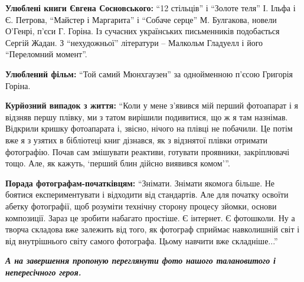 \textbf{Улюблені книги Євгена Сосновського:} \enquote{12 стільців} і \enquote{Золоте теля} І.
Ільфа і Є.  Петрова, \enquote{Майстер і Маргарита} і \enquote{Собаче серце} М. Булгакова,
новели О'Генрі, п'єси Г. Горіна. Із сучасних українських письменників
подобається Сергій Жадан.  З \enquote{нехудожньої} літератури – Малкольм Гладуелл і
його \enquote{Переломний момент}.

\textbf{Улюблений фільм:} \enquote{Той самий Мюнхгаузен} за однойменною п'єсою Григорія
Горіна.

\textbf{Курйозний випадок з життя:} \enquote{Коли у мене з'явився мій перший фотоапарат
і я відзняв першу плівку, ми з татом вирішили подивитися, що ж я там назнімав.
Відкрили кришку фотоапарата і, звісно, нічого на плівці не побачили. Це потім
вже я з узятих в бібліотеці книг дізнався, як з відзнятої плівки отримати
фотографію. Почав сам змішувати реактиви, готувати проявники, закріплювачі
тощо. Але, як кажуть, \enquote{перший блин дійсно виявився комом}}.

\textbf{Порада фотографам-початківцям:} \enquote{Знімати. Знімати якомога більше. Не
боятися експериментувати і відходити від стандартів. Але для початку освоїти
абетку фотографії, щоб розуміти технічну сторону процесу зйомки, основи
композиції.  Зараз це зробити набагато простіше. Є інтернет. Є фотошколи. Ну а
творча складова вже залежить від того, як фотограф сприймає навколишній світ і
від внутрішнього світу самого фотографа. Цьому навчити вже складніше...}

\begin{center}
\color{blue}\em\textbf{А на завершення пропоную переглянути фото нашого талановитого і непересічного героя.}
\end{center}


\clearpage
